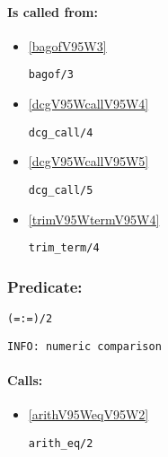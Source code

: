 \paragraph{Is called from:} 
\begin{itemize}
\item \ref{bagofV95W3} 
\begin{verbatim}
bagof/3
\end{verbatim}

\item \ref{dcgV95WcallV95W4} 
\begin{verbatim}
dcg_call/4
\end{verbatim}

\item \ref{dcgV95WcallV95W5} 
\begin{verbatim}
dcg_call/5
\end{verbatim}

\item \ref{trimV95WtermV95W4} 
\begin{verbatim}
trim_term/4
\end{verbatim}

\end{itemize}

\subsubsection{Predicate:} \label{V61WV58WV61WV95W2}

\begin{verbatim}
(=:=)/2
\end{verbatim}

{\small \begin{verbatim}
INFO: numeric comparison

\end{verbatim}}
\paragraph{Calls:} 
\begin{itemize}
\item \ref{arithV95WeqV95W2} 
\begin{verbatim}
arith_eq/2
\end{verbatim}

\end{itemize}
